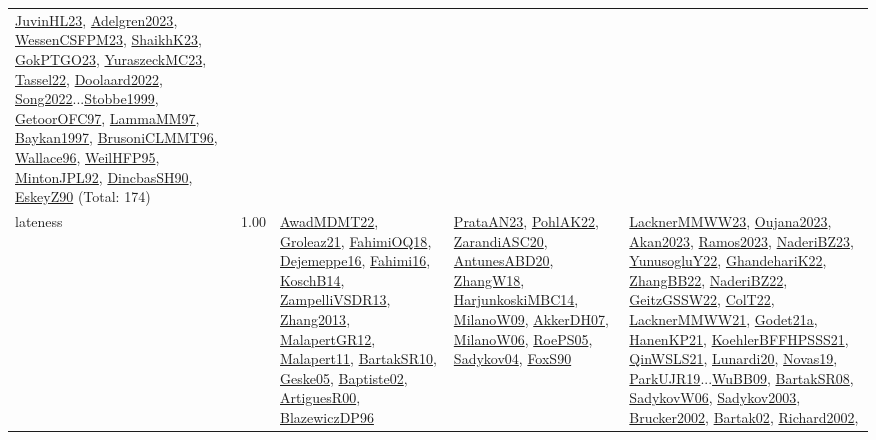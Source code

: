 {\begin{longtable}{p{3cm}r>{\raggedright\arraybackslash}p{6cm}>{\raggedright\arraybackslash}p{6cm}>{\raggedright\arraybackslash}p{8cm}}
\hyperref[detail:JuvinHL23]{JuvinHL23}, \hyperref[detail:Adelgren2023]{Adelgren2023}, \hyperref[detail:WessenCSFPM23]{WessenCSFPM23}, \hyperref[detail:ShaikhK23]{ShaikhK23}, \hyperref[detail:GokPTGO23]{GokPTGO23}, \hyperref[detail:YuraszeckMC23]{YuraszeckMC23}, \hyperref[detail:Tassel22]{Tassel22}, \hyperref[detail:Doolaard2022]{Doolaard2022}, \hyperref[detail:Song2022]{Song2022}...\hyperref[detail:Stobbe1999]{Stobbe1999}, \hyperref[detail:GetoorOFC97]{GetoorOFC97}, \hyperref[detail:LammaMM97]{LammaMM97}, \hyperref[detail:Baykan1997]{Baykan1997}, \hyperref[detail:BrusoniCLMMT96]{BrusoniCLMMT96}, \hyperref[detail:Wallace96]{Wallace96}, \hyperref[detail:WeilHFP95]{WeilHFP95}, \hyperref[detail:MintonJPL92]{MintonJPL92}, \hyperref[detail:DincbasSH90]{DincbasSH90}, \hyperref[detail:EskeyZ90]{EskeyZ90} (Total: 174)\\
\index{lateness}\index{Concepts!lateness}lateness &  1.00 & \hyperref[detail:AwadMDMT22]{AwadMDMT22}, \hyperref[detail:Groleaz21]{Groleaz21}, \hyperref[detail:FahimiOQ18]{FahimiOQ18}, \hyperref[detail:Dejemeppe16]{Dejemeppe16}, \hyperref[detail:Fahimi16]{Fahimi16}, \hyperref[detail:KoschB14]{KoschB14}, \hyperref[detail:ZampelliVSDR13]{ZampelliVSDR13}, \hyperref[detail:Zhang2013]{Zhang2013}, \hyperref[detail:MalapertGR12]{MalapertGR12}, \hyperref[detail:Malapert11]{Malapert11}, \hyperref[detail:BartakSR10]{BartakSR10}, \hyperref[detail:Geske05]{Geske05}, \hyperref[detail:Baptiste02]{Baptiste02}, \hyperref[detail:ArtiguesR00]{ArtiguesR00}, \hyperref[detail:BlazewiczDP96]{BlazewiczDP96} & \hyperref[detail:PrataAN23]{PrataAN23}, \hyperref[detail:PohlAK22]{PohlAK22}, \hyperref[detail:ZarandiASC20]{ZarandiASC20}, \hyperref[detail:AntunesABD20]{AntunesABD20}, \hyperref[detail:ZhangW18]{ZhangW18}, \hyperref[detail:HarjunkoskiMBC14]{HarjunkoskiMBC14}, \hyperref[detail:MilanoW09]{MilanoW09}, \hyperref[detail:AkkerDH07]{AkkerDH07}, \hyperref[detail:MilanoW06]{MilanoW06}, \hyperref[detail:RoePS05]{RoePS05}, \hyperref[detail:Sadykov04]{Sadykov04}, \hyperref[detail:FoxS90]{FoxS90} & \hyperref[detail:LacknerMMWW23]{LacknerMMWW23}, \hyperref[detail:Oujana2023]{Oujana2023}, \hyperref[detail:Akan2023]{Akan2023}, \hyperref[detail:Ramos2023]{Ramos2023}, \hyperref[detail:NaderiBZ23]{NaderiBZ23}, \hyperref[detail:YunusogluY22]{YunusogluY22}, \hyperref[detail:GhandehariK22]{GhandehariK22}, \hyperref[detail:ZhangBB22]{ZhangBB22}, \hyperref[detail:NaderiBZ22]{NaderiBZ22}, \hyperref[detail:GeitzGSSW22]{GeitzGSSW22}, \hyperref[detail:ColT22]{ColT22}, \hyperref[detail:LacknerMMWW21]{LacknerMMWW21}, \hyperref[detail:Godet21a]{Godet21a}, \hyperref[detail:HanenKP21]{HanenKP21}, \hyperref[detail:KoehlerBFFHPSSS21]{KoehlerBFFHPSSS21}, \hyperref[detail:QinWSLS21]{QinWSLS21}, \hyperref[detail:Lunardi20]{Lunardi20}, \hyperref[detail:Novas19]{Novas19}, \hyperref[detail:ParkUJR19]{ParkUJR19}...\hyperref[detail:WuBB09]{WuBB09}, \hyperref[detail:BartakSR08]{BartakSR08}, \hyperref[detail:SadykovW06]{SadykovW06}, \hyperref[detail:Sadykov2003]{Sadykov2003}, \hyperref[detail:Brucker2002]{Brucker2002}, \hyperref[detail:Bartak02]{Bartak02}, \hyperref[detail:Richard2002]{Richard2002}, 
\end{longtable}}
